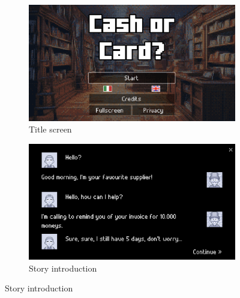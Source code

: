 \documentclass[a4paper,11pt]{article}
\begin{document}
\begin{figure}[p]
  \centering
  \begin{subfigure}{0.475\textwidth}
    \centering
    \includegraphics[width=\textwidth]{figures/title.png}
    \caption{Title screen}\label{fig:title}
  \end{subfigure}
  \hfill
  \begin{subfigure}{0.475\textwidth}
    \centering
    \includegraphics[width=\textwidth]{figures/story.png}
    \caption{Story introduction}\label{fig:story}
  \end{subfigure}


\end{figure}
\end{document}
